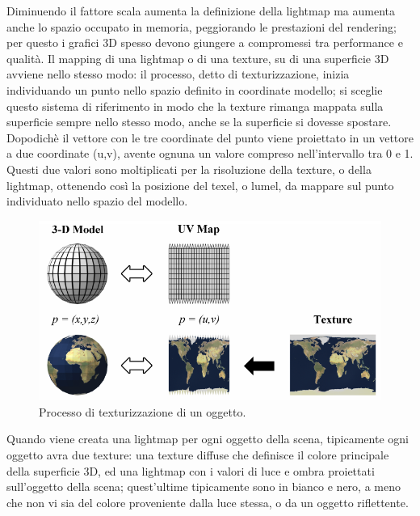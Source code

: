 Diminuendo il fattore scala aumenta la definizione della lightmap ma aumenta anche lo spazio occupato in memoria, peggiorando le prestazioni del rendering; per questo i grafici 3D spesso devono giungere a compromessi tra performance e qualità. Il mapping di una lightmap o di una texture, su di una superficie 3D avviene nello stesso modo: il processo, detto di texturizzazione, inizia individuando un punto nello spazio definito in coordinate modello; si sceglie questo sistema di riferimento in modo che la texture rimanga mappata sulla superficie sempre nello stesso modo, anche se la superficie si dovesse spostare. Dopodichè il vettore con le tre coordinate del punto viene proiettato in un vettore a due coordinate (u,v), avente ognuna un valore compreso nell’intervallo tra 0 e 1. Questi due valori sono moltiplicati per la risoluzione della texture, o della lightmap, ottenendo così la posizione del texel, o lumel, da mappare sul punto individuato nello spazio del modello.
\\
\begin{figure}[htb]
 \centering
 \includegraphics[width=0.8\linewidth]{images/chapter_stato_arte/stato_arte_uvmap.png}\hfill
 \caption[Texturizzazione mediante mappa UV]{Processo di texturizzazione di un oggetto.}
 \label{fig:stato_arte_uvmap}
\end{figure}

Quando viene creata una lightmap per ogni oggetto della scena, tipicamente ogni oggetto avra due texture: una texture diffuse che definisce il colore principale della superficie 3D, ed una lightmap con i valori di luce e ombra proiettati sull’oggetto della scena; quest’ultime tipicamente sono in bianco e nero, a meno che non vi sia del colore proveniente dalla luce stessa, o da un oggetto riflettente. 


